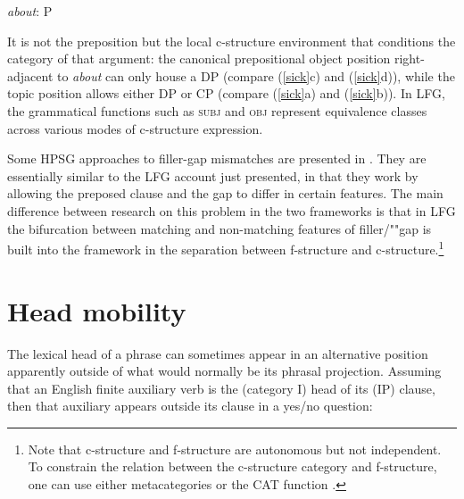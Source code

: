 \eal \label{talk-about}
{{\it about}\/: P}\qquad{}    
\zl


\noindent
It is not the preposition but the local c-structure environment that conditions the category of that argument: the canonical prepositional object position right-adjacent to \textit{about} can only house a DP (compare (\ref{sick}c) and (\ref{sick}d)), while the topic position allows either DP or CP (compare (\ref{sick}a) and (\ref{sick}b)).  In LFG, the grammatical functions such as \textsc{subj} and \textsc{obj} represent equivalence classes across various modes of c-structure expression.  

Some HPSG approaches to filler-gap mismatches are presented in .  They are essentially similar to the LFG account just presented, in that they work by allowing the preposed clause and the gap to differ in certain features.  The main difference between research on this problem in the two frameworks is that in LFG the bifurcation between matching and non-matching features of filler/""gap  is built into the framework in the separation between f-structure and c-structure.\footnote{Note that c-structure and f-structure are autonomous but not independent.  To constrain the relation between the c-structure category and f-structure, one can use either metacategories \citep[691-698]{dalrymple;ea19} or the CAT function \citep[265]{dalrymple;ea19}.}  



\section{Head mobility} 
\label{mobile-sec}
The lexical head of a phrase can sometimes appear in an alternative position apparently outside of what would normally be its phrasal projection.  Assuming that an English finite auxiliary verb is the (category I) head of its (IP) clause, then that auxiliary appears outside its clause in a yes/no question:

